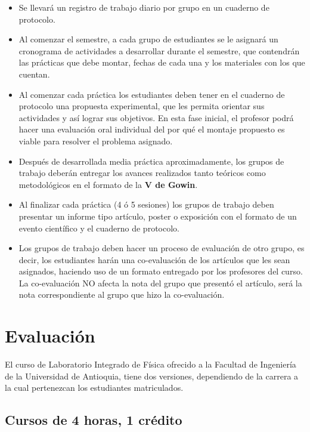 \documentclass[12pt]{article}
\begin{document}
\begin{itemize}
    \item Se llevará un registro de trabajo diario por grupo en un cuaderno de protocolo.
    \item Al comenzar el semestre, a cada grupo de estudiantes se le asignará un cronograma de actividades a desarrollar durante el semestre, que contendrán las prácticas que debe montar, fechas de cada una y los materiales con los que cuentan. 
    \item Al comenzar cada práctica los estudiantes deben tener en el cuaderno de protocolo una propuesta experimental, que les permita orientar sus actividades y así lograr sus objetivos. En esta fase inicial, el profesor podrá hacer una evaluación oral individual del por qué el montaje propuesto es viable para resolver el problema asignado. 
    \item Después de desarrollada media práctica aproximadamente, los grupos de trabajo deberán entregar los avances realizados tanto teóricos como metodológicos en el formato de la \textbf{V de Gowin}.
    \item Al finalizar cada práctica (4 ó 5 sesiones) los grupos de trabajo deben presentar un informe tipo artículo, poster o exposición con el formato de un evento científico y el cuaderno de protocolo.
    \item Los grupos de trabajo deben hacer un proceso de evaluación de otro grupo, es decir, los estudiantes harán una co-evaluación de los artículos que les sean asignados, haciendo uso de un formato entregado por los profesores del curso. La co-evaluación NO afecta la nota del grupo que presentó el artículo, será la nota correspondiente al grupo que hizo la co-evaluación.
\end{itemize}

\newpage


\section{Evaluación}

El curso de Laboratorio Integrado de Física ofrecido a la Facultad de Ingeniería de la Universidad de Antioquia, tiene dos versiones, dependiendo de la carrera a la cual pertenezcan los estudiantes matriculados.

\subsection*{Cursos de 4 horas, 1 crédito}
\end{document}
